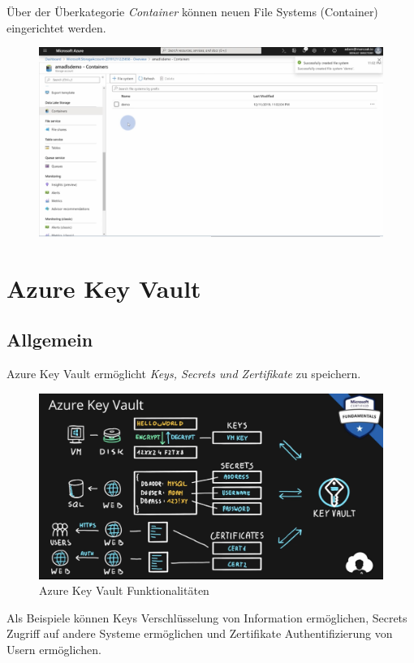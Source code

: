 Über der Überkategorie \textit{Container} können neuen File Systems (Container) eingerichtet werden.

\begin{figure}[H]
	\centering
	\includegraphics[scale = 0.3]{attachment/chapter_2/Scc115}
\end{figure}




\section{Azure Key Vault}
\subsection{Allgemein}
Azure Key Vault ermöglicht \textit{Keys, Secrets und Zertifikate} zu speichern.

\begin{figure}[H]
	\centering
	\includegraphics[scale = 0.2]{attachment/chapter_2/Scc131}
	\caption{Azure Key Vault Funktionalitäten}
\end{figure}

Als Beispiele können Keys Verschlüsselung von Information ermöglichen, Secrets Zugriff auf andere Systeme ermöglichen und Zertifikate Authentifizierung von Usern ermöglichen.\\

